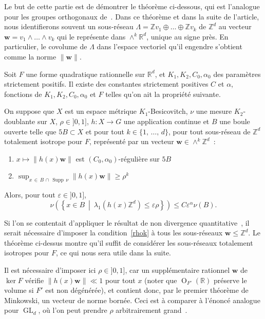 \documentclass[AHL,Unicode,longabstracts,francais,published]{cedram}
\DeclareMathOperator{\GL}{GL}
\DeclareMathOperator{\GO}{O}
\DeclareMathOperator{\Supp}{Supp}
\newcommand{\R}{\mathbb{R}}
\newcommand{\Z}{\mathbb{Z}}
\newcommand{\bw}{\mathbf{w}}
\newcommand{\eps}{\varepsilon}
\begin{document}
Le but de cette partie est de démontrer le théorème ci-dessous, qui est l'analogue pour les groupes orthogonaux de~\cite[Theorem~0.2]{kleinbock_anextension}. Dans ce théorème et dans la suite de l'article, nous identifierons souvent un sous-réseau $\Lambda=\Z v_1\oplus\dots\oplus\Z v_k$ de $\Z^d$ au vecteur $\bw=v_1\wedge\dots\wedge v_k$ qui le représente dans $\wedge^k\R^d$, unique au signe près. En particulier, le covolume de $\Lambda$ dans l'espace vectoriel qu'il engendre s'obtient comme la norme $\|\bw\|$.

\begin{theo}[Non divergence pour $\GO_F$]\label{nondiv}
Soit $F$ une forme quadratique rationnelle sur $\R^d$, et $K_1,K_2,C_0,\alpha_0$ des paramètres strictement positifs. Il existe des constantes strictement positives $C$ et $\alpha$, fonctions de $K_1,K_2,C_0,\alpha_0$ et $F$ telles qu'on ait la propriété suivante.


On suppose que $X$ est un espace métrique $K_1$-Besicovitch, $\nu$ une mesure $K_2$-doublante sur $X$, $\rho\in]0,1]$, $h:X\to G$ une application continue et $B$ une boule ouverte telle que $5B\subset X$ et pour tout $k\in\{1,\,\dots,\,d\}$, pour tout sous-réseau de $\Z^d$ totalement isotrope pour $F$, représenté par un vecteur $\bw\in\wedge^k\Z^d$~:
\begin{enumerate}
\item $x\mapsto \|h(x)\bw\|$ est $(C_0,\alpha_0)$-régulière sur $5B$
\item \label{rhok}
$\sup_{x\,\in\,B\,\cap\,\Supp\,\nu}\|h(x)\bw\|\geq\rho^{k}$
\end{enumerate}
Alors, pour tout $\eps\in]0,1]$,
\[
\nu\left(\left\{x\in B\ \middle|\ \lambda_1\left(h(x)\Z^d\right)\leq\eps\rho\right\}\right)
\leq C\eps^\alpha\nu(B).
\]
\end{theo}

\begin{rema}
Si l'on se contentait d'appliquer le résultat de non divergence quantitative~\cite[Theorem~0.2]{kleinbock_anextension}, il serait nécessaire d'imposer la condition~\ref{rhok} à tous les sous-réseaux $\bw\leq\Z^d$. Le théorème ci-dessus montre qu'il suffit de considérer les sous-réseaux totalement isotropes pour $F$, ce qui nous sera utile dans la suite.
\end{rema}

\begin{rema}
Il est nécessaire d'imposer ici $\rho\in]0,1]$, car un supplémentaire rationnel $\bw$ de $\ker F$ vérifie $\|h(x)\bw\|\ll 1$ pour tout $x$ (noter que $\GO_{F'}(\R)$ préserve le volume si $F'$ est non dégénérée), et contient donc, par le premier théorème de Minkowski, un vecteur de norme bornée. Ceci est à comparer à l'énoncé analogue pour $\GL_d$, où l'on peut prendre $\rho$ arbitrairement grand~\cite[Theorem~2.2.1]{saxce_hnnondivergence}.
\end{rema}
\end{document}
